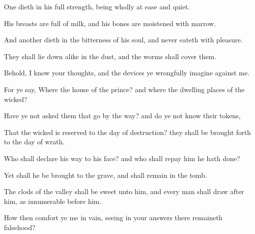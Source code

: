 {One
dieth in his
full
strength, being wholly at
ease and
quiet.

His
breasts are
full of
milk, and his
bones are
moistened with
marrow.

And another
dieth in the
bitterness of his
soul, and never
eateth with
pleasure.

They shall lie
down
alike in the
dust, and the
worms shall
cover them.


\par }{\PP {}Behold, I
know your
thoughts, and the
devices
{} ye wrongfully
imagine against me.

For ye
say, Where
{} the
house of the
prince? and where
{} the
dwelling
places of the
wicked?

Have ye not
asked them that
go by the
way? and do ye not
know their
tokens,

That the
wicked is
reserved to the
day of
destruction? they shall be brought
forth to the
day of
wrath.

Who shall
declare his
way to his
face? and who shall
repay him
{} he hath
done?

Yet shall he be
brought to the
grave, and shall
remain in the
tomb.

The
clods of the
valley shall be
sweet unto him, and every
man shall
draw
after him, as
{}
innumerable
before him.

How then
comfort ye me in
vain, seeing in your
answers there
remaineth
falsehood?




\par }
